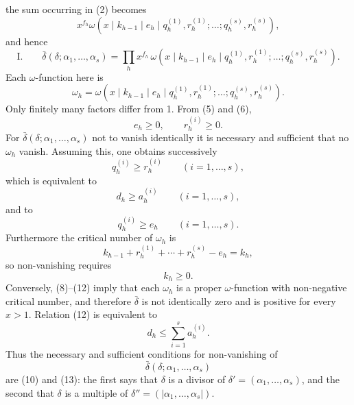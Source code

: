 the sum occurring in (2) becomes
\[
 x^{f_h}\omega(x\mid k_{h-1}\mid e_h\mid q_h^{(1)},r_h^{(1)};\ldots;q_h^{(s)},r_h^{(s)}),
\]
and hence
\[
\text{I.}\qquad
 \bar\delta(\delta;\alpha_1,
\ldots,\alpha_s)=\prod_h x^{f_h}\,
 \omega(x\mid k_{h-1}\mid e_h\mid q_h^{(1)},r_h^{(1)};\ldots;q_h^{(s)},r_h^{(s)}).
\]
Each $\omega$-function here is
\begin{equation}
 \omega_h=\omega(x\mid k_{h-1}\mid e_h\mid q_h^{(1)},r_h^{(1)};\ldots;q_h^{(s)},r_h^{(s)}).
\tag{7}
\end{equation}
Only finitely many factors differ from 1. From (5) and (6),
\begin{equation}
 e_h\ge0,
 \qquad r_h^{(i)}\ge0.
\tag{8}
\end{equation}
For $\bar\delta(\delta;\alpha_1,
\ldots,\alpha_s)$ not to vanish identically it is necessary and sufficient that no $\omega_h$ vanish. Assuming this, one obtains successively
\begin{equation}
 q_h^{(i)}\ge r_h^{(i)}\qquad(i=1,
\ldots,s),
\tag{9}
\end{equation}
which is equivalent to
\begin{equation}
 d_h\ge a_h^{(i)}\qquad(i=1,
\ldots,s),
\tag{10}
\end{equation}
and to
\begin{equation}
 q_h^{(i)}\ge e_h\qquad(i=1,
\ldots,s).
\tag{11}
\end{equation}
Furthermore the critical number of $\omega_h$ is
\[
 k_{h-1}+r_h^{(1)}+\cdots+r_h^{(s)}-e_h=k_h,
\]
so non-vanishing requires
\begin{equation}
 k_h\ge0.
\tag{12}
\end{equation}
Conversely, (8)--(12) imply that each $\omega_h$ is a proper $\omega$-function with non-negative critical number, and therefore $\bar\delta$ is not identically zero and is positive for every $x>1$. Relation (12) is equivalent to
\begin{equation}
 d_h\le\sum_{i=1}^s a_h^{(i)}.
\tag{13}
\end{equation}
Thus the necessary and sufficient conditions for non-vanishing of
\[
 \bar\delta(\delta;\alpha_1,
\ldots,\alpha_s)
\]
are (10) and (13): the first says that $\delta$ is a divisor of $\delta'=(\alpha_1,
\ldots,\alpha_s)$, and the second that $\delta$ is a multiple of $\delta''=(|\alpha_1,
\ldots,\alpha_s|)$.

